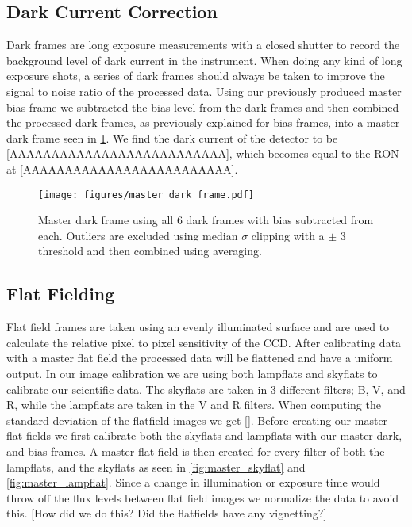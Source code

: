 \documentclass[twocolumn]{aastex631}
\begin{document}
\subsection{Dark Current Correction}
\label{subsec:darks}
Dark frames are long exposure measurements with a closed shutter to record the background level of dark current in the instrument. When doing any kind of long exposure shots, a series of dark frames should always be taken to improve the signal to noise ratio of the processed data. Using our previously produced master bias frame we subtracted the bias level from the dark frames and then combined the processed dark frames, as previously explained for bias frames, into a master dark frame seen in \ref{fig:master_dark}. We find the dark current of the detector to be [AAAAAAAAAAAAAAAAAAAAAAAAAA], which becomes equal to the RON at [AAAAAAAAAAAAAAAAAAAAAAAAA].
\begin{figure}[ht!]
    \begin{centering}
        \texttt{[image: figures/master\_dark\_frame.pdf]}
        \caption{Master dark frame using all 6 dark frames with bias subtracted from each. Outliers are excluded using median $\sigma$ clipping with a $\pm$ 3 threshold and then combined using averaging.}
        \label{fig:master_dark}
    \end{centering}
\end{figure}

\subsection{Flat Fielding}
\label{subsec:flats}
Flat field frames are taken using an evenly illuminated surface and are used to calculate the relative pixel to pixel sensitivity of the CCD. After calibrating data with a master flat field the processed data will be flattened and have a uniform output. In our image calibration we are using both lampflats and skyflats to calibrate our scientific data. The skyflats are taken in 3 different filters; B, V, and R, while the lampflats are taken in the V and R filters. 
When computing the standard deviation of the flatfield images we get []. Before creating our master flat fields we first calibrate both the skyflats and lampflats with our master dark, and bias frames. A master flat field is then created for every filter of both the lampflats, and the skyflats as seen in \ref{fig:master_skyflat} and \ref{fig:master_lampflat}. Since a change in illumination or exposure time would throw off the flux levels between flat field images we normalize the data to avoid this. [How did we do this? Did the flatfields have any vignetting?]
\end{document}
